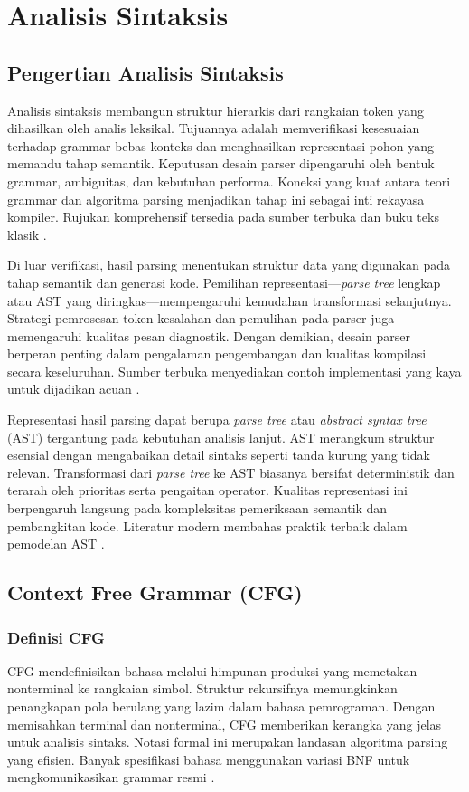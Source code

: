 \documentclass[../main.tex]{subfiles}
\begin{document}
\chapter{Analisis Sintaksis}

\section{Pengertian Analisis Sintaksis}
Analisis sintaksis membangun struktur hierarkis dari rangkaian token yang dihasilkan oleh analis leksikal. Tujuannya adalah memverifikasi kesesuaian terhadap grammar bebas konteks dan menghasilkan representasi pohon yang memandu tahap semantik. Keputusan desain parser dipengaruhi oleh bentuk grammar, ambiguitas, dan kebutuhan performa. Koneksi yang kuat antara teori grammar dan algoritma parsing menjadikan tahap ini sebagai inti rekayasa kompiler. Rujukan komprehensif tersedia pada sumber terbuka dan buku teks klasik \citep{Mogensen2010,Wirth1996}.

Di luar verifikasi, hasil parsing menentukan struktur data yang digunakan pada tahap semantik dan generasi kode. Pemilihan representasi—\emph{parse tree} lengkap atau AST yang diringkas—mempengaruhi kemudahan transformasi selanjutnya. Strategi pemrosesan token kesalahan dan pemulihan pada parser juga memengaruhi kualitas pesan diagnostik. Dengan demikian, desain parser berperan penting dalam pengalaman pengembangan dan kualitas kompilasi secara keseluruhan. Sumber terbuka menyediakan contoh implementasi yang kaya untuk dijadikan acuan \citep{CS143}.

Representasi hasil parsing dapat berupa \emph{parse tree} atau \emph{abstract syntax tree} (AST) tergantung pada kebutuhan analisis lanjut. AST merangkum struktur esensial dengan mengabaikan detail sintaks seperti tanda kurung yang tidak relevan. Transformasi dari \emph{parse tree} ke AST biasanya bersifat deterministik dan terarah oleh prioritas serta pengaitan operator. Kualitas representasi ini berpengaruh langsung pada kompleksitas pemeriksaan semantik dan pembangkitan kode. Literatur modern membahas praktik terbaik dalam pemodelan AST \citep{WikiAST}.

\section{Context Free Grammar (CFG)}
\subsection{Definisi CFG}
CFG mendefinisikan bahasa melalui himpunan produksi yang memetakan nonterminal ke rangkaian simbol. Struktur rekursifnya memungkinkan penangkapan pola berulang yang lazim dalam bahasa pemrograman. Dengan memisahkan terminal dan nonterminal, CFG memberikan kerangka yang jelas untuk analisis sintaks. Notasi formal ini merupakan landasan algoritma parsing yang efisien. Banyak spesifikasi bahasa menggunakan variasi BNF untuk mengkomunikasikan grammar resmi \citep{Mogensen2010}.
\end{document}
